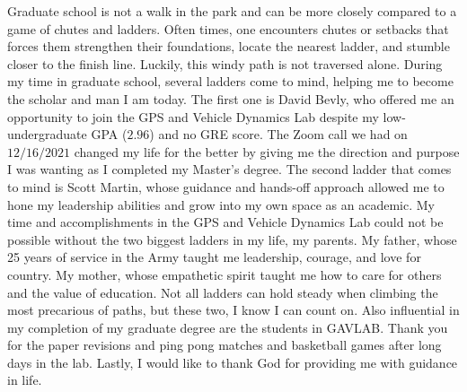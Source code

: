 \documentclass[12pt]{report}
\begin{document}
\begin{romanpages}
  \begin{acknowledgments}
    Graduate school is not a walk in the park and can be more closely compared to a game of chutes and ladders. Often times, one encounters chutes or setbacks that forces them strengthen their foundations, locate the nearest ladder, and stumble closer to the finish line. Luckily, this windy path is not traversed alone. During my time in graduate school, several ladders come to mind, helping me to become the scholar and man I am today. The first one is David Bevly, who offered me an opportunity to join the GPS and Vehicle Dynamics Lab despite my low-undergraduate GPA (\(2.96\)) and no GRE score. The Zoom call we had on \(12/16/2021\) changed my life for the better by giving me the direction and purpose I was wanting as I completed my Master's degree. The second ladder that comes to mind is Scott Martin, whose guidance and hands-off approach allowed me to hone my leadership abilities and grow into my own space as an academic. My time and accomplishments in the GPS and Vehicle Dynamics Lab could not be possible without the two biggest ladders in my life, my parents. My father, whose 25 years of service in the Army taught me leadership, courage, and love for country. My mother, whose empathetic spirit taught me how to care for others and the value of education. Not all ladders can hold steady when climbing the most precarious of paths, but these two, I know I can count on. Also influential in my completion of my graduate degree are the students in GAVLAB\@. Thank you for the paper revisions and ping pong matches and basketball games after long days in the lab. Lastly, I would like to thank God for providing me with guidance in life.
  \end{acknowledgments}


  \begin{singlespace}

    \begin{center}
      \renewcommand{\cftchapfont}{}
      \renewcommand{\cftchappagefont}{}
      \renewcommand{\cfttoctitlefont}{\normalsize}%
      \renewcommand{\cftsecfont}{\normalsize}%
      \renewcommand{\cftsecpagefont}{\normalsize}%
      \tableofcontents
      \newpage
      \renewcommand{\cftchapfont}{}
      \renewcommand{\cftchappagefont}{}
      \renewcommand{\cftloftitlefont}{\normalsize}%
      \renewcommand{\cftsecfont}{\normalsize}%
      \renewcommand{\cftsecpagefont}{\normalsize}%
      \listoffigures
      \newpage
      \renewcommand{\cftchapfont}{}
      \renewcommand{\cftchappagefont}{}
      \renewcommand{\cftlottitlefont}{\normalsize}%
      \renewcommand{\cftsecfont}{\normalsize}%
      \renewcommand{\cftsecpagefont}{\normalsize}%
      \listoftables
    \end{center}
  \end{singlespace}


\end{romanpages}
\end{document}
